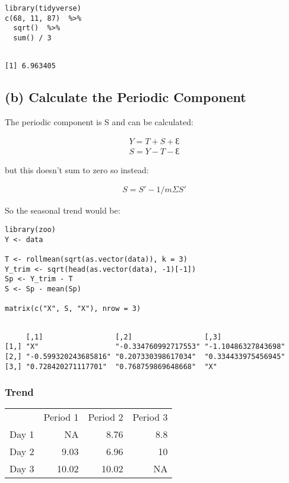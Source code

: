 \documentclass[11pt]{article}
\begin{document}
\begin{verbatim}
library(tidyverse)
c(68, 11, 87)  %>%
  sqrt()  %>%
  sum() / 3
\end{verbatim}

\begin{verbatim}

[1] 6.963405
\end{verbatim}

\subsection{(b) Calculate the Periodic Component}
\label{sec:org0daf4cc}
The periodic component is S and can be calculated:


$$\begin{aligned}
Y  = T + S + Ɛ               \\
S = Y -T -Ɛ
\end{aligned}$$

but this doesn't sum to zero so instead:


$$\begin{aligned}
S = S' -1/m Σ S'
\end{aligned}$$

So the seasonal trend would be:

\begin{verbatim}
library(zoo)
Y <- data

T <- rollmean(sqrt(as.vector(data)), k = 3)
Y_trim <- sqrt(head(as.vector(data), -1)[-1])
Sp <- Y_trim - T
S <- Sp - mean(Sp)

matrix(c("X", S, "X"), nrow = 3)
\end{verbatim}

\begin{verbatim}

     [,1]                 [,2]                 [,3]
[1,] "X"                  "-0.334760992717553" "-1.10486327843698"
[2,] "-0.599320243685816" "0.207330398617034"  "0.334433975456945"
[3,] "0.728420271117701"  "0.768759869648668"  "X"
\end{verbatim}

\subsubsection{Trend}
\label{sec:orgf765734}

\begin{center}
\begin{tabular}{lrrr}
 & Period 1 & Period 2 & Period 3\\
Day 1 & NA & 8.76 & 8.8\\
Day 2 & 9.03 & 6.96 & 10\\
Day 3 & 10.02 & 10.02 & NA\\
\end{tabular}
\end{center}
\end{document}
